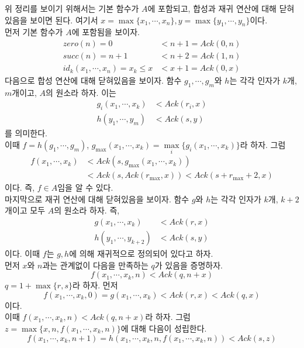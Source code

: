 \documentclass[b5paper]{book}
\theoremstyle{definition}
\newenvironment{pf*}{\pushQED{\qed}\pf}{\popQED\endpf}
\begin{document}
\begin{pf*}
    위 정리를 보이기 위해서는 기본 함수가 $A$에 포함되고, 합성과 재귀 연산에 대해 닫혀있음을 보이면 된다. 
    여기서 $x = \max \{x_1, \cdots, x_n\}, y = \max\{y_1, \cdots, y_n\}$이다. \\ 
    먼저 기본 함수가 $A$에 포함됨을 보이자.  
    \begin{align*}
        zero(n) = 0 &< n+1 = Ack(0,n) \\ 
        succ(n) = n+1 &<n+2 = Ack(1,n) \\ 
        id_k(x_1, \cdots, x_n) = x_k \le x &< x+1 = Ack(0,x) 
    \end{align*} 
    다음으로 합성 연산에 대해 닫혀있음을 보이자. 함수 $g_1, \cdots, g_m$와 $h$는 각각 인자가 $k$개, $m$개이고, 
    $A$의 원소라 하자. 이는 
    \begin{align*}
        g_i(x_1, \cdots, x_k) &< Ack(r_i, x) \\ 
        h(y_1, \cdots, y_m) &< Ack(s,y)
    \end{align*}
    를 의미한다. \\ 
    이때 $f = h(g_1, \cdots, g_m)$, $ g_{\max} (x_1,\cdots, x_k) =\underset{i}{\max} \{g_i(x_1, \cdots, x_k)\}$라 하자. 
    그럼 
    \begin{align*}
        f(x_1, \cdots, x_k) &< Ack(s, g_{\max}(x_1, \cdots, x_k)) \\ 
        &< Ack(s, Ack(r_{\max},x)) < Ack(s+r_{\max}+2,x)
    \end{align*}
    이다. 
    즉, $f \in A$임을 알 수 있다. \\ 
    마지막으로 재귀 연산에 대해 닫혀있음을 보이자. 함수 $g$와 $h$는 각각 인자가 $k$개, $k+2$개이고 모두 $A$의 원소라 
    하자. 즉, 
    \begin{align*}
        g(x_1, \cdots, x_k) &< Ack(r, x) \\ 
        h(y_1,\cdots, y_{k+2}) &< Ack(s,y)
    \end{align*}
    이다. 이때
    $f$는 $g,h$에 의해 재귀적으로 정의되어 있다고 하자.\\ 
    먼저 $x$와 $n$과는 관계없이 다음을 만족하는 $q$가 있음을 증명하자. 
    $$f(x_1, \cdots, x_k, n) < Ack(q, n+x)$$
    $q= 1 + \max \{r,s\}$라 하자. 
    먼저 
    $$f(x_1, \cdots, x_k, 0) = g(x_1, \cdots, x_k) < Ack(r,x) <Ack(q,x)$$
    이다.\\
    이때 $f(x_1, \cdots,x_k, n) < Ack(q, n+x)$라 하자.  
    그럼 $z = \max\{x,n,f(x_1, \cdots, x_k, n)\}$에 대해 다음이
    성립한다.
    $$f(x_1, \cdots, x_k, n+1) = h(x_1, \cdots, x_k, n, f(x_1,\cdots, x_k ,n)) < Ack(s, z)$$

\end{pf*}
\end{document}
